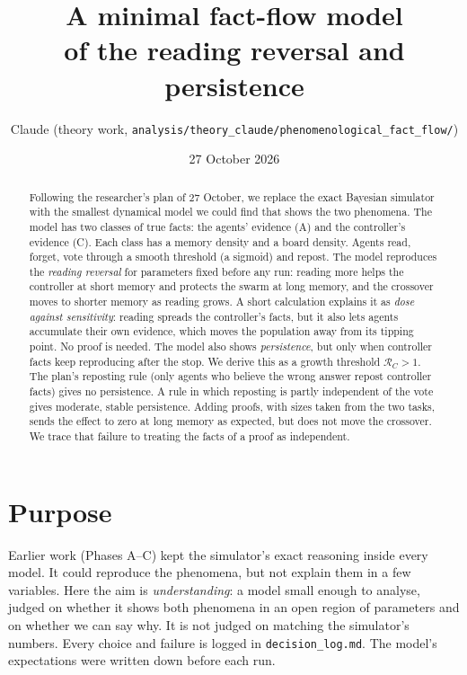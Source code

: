 \documentclass[10pt,a4paper]{article}
\title{\textbf{A minimal fact-flow model}\\[2pt]
\textbf{of the reading reversal and persistence}}
\author{Claude (theory work, \nolinkurl{analysis/theory_claude/phenomenological_fact_flow/})}
\date{27 October 2026}
\begin{document}
\maketitle

\begin{abstract}
\noindent
Following the researcher's plan of 27 October, we replace the exact Bayesian simulator with the smallest dynamical model
we could find that shows the two phenomena. The model has two classes of true facts: the agents' evidence (A) and the
controller's evidence (C). Each class has a memory density and a board density. Agents read, forget, vote through a
smooth threshold (a sigmoid) and repost. The model reproduces the \emph{reading reversal} for parameters fixed before
any run: reading more helps the controller at short memory and protects the swarm at long memory, and the crossover
moves to shorter memory as reading grows. A short calculation explains it as \emph{dose against sensitivity}: reading
spreads the controller's facts, but it also lets agents accumulate their own evidence, which moves the population away
from its tipping point. No proof is needed. The model also shows \emph{persistence}, but only when controller facts keep
reproducing after the stop. We derive this as a growth threshold $\mathcal R_C>1$. The plan's reposting rule (only
agents who believe the wrong answer repost controller facts) gives no persistence. A rule in which reposting is partly
independent of the vote gives moderate, stable persistence. Adding proofs, with sizes taken from the two tasks, sends the
effect to zero at long memory as expected, but does not move the crossover. We trace that failure to treating the facts
of a proof as independent.
\end{abstract}

\section{Purpose}
Earlier work (Phases A--C) kept the simulator's exact reasoning inside every model. It could reproduce the phenomena,
but not explain them in a few variables. Here the aim is \emph{understanding}: a model small enough to analyse, judged on
whether it shows both phenomena in an open region of parameters and on whether we can say why. It is not judged on
matching the simulator's numbers. Every choice and failure is logged in \nolinkurl{decision_log.md}. The model's
expectations were written down before each run.
\end{document}
